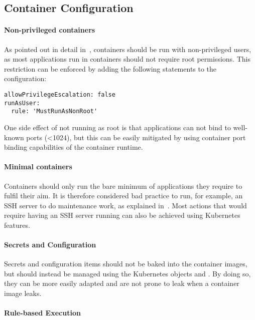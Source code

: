 \subsection{Container Configuration}

\paragraph{Non-privileged containers}

As pointed out in detail in~\textcite{nonPrivContainers}, containers should be run with non-privileged users, as most applications run in containers should not require root permissions. This restriction can be enforced by adding the following statements to the  configuration:

\begin{verbatim}
allowPrivilegeEscalation: false
runAsUser:
  rule: 'MustRunAsNonRoot'
\end{verbatim}

One side effect of not running as root is that applications can not bind to well-known ports (\textless 1024), but this can be easily mitigated by using container port binding capabilities of the container runtime.

\paragraph{Minimal containers}

Containers should only run the bare minimum of applications they require to fulfil their aim. It is therefore considered bad practice to run, for example, an SSH server to do maintenance work, as explained in~\textcite{noSSHDinContainers}. Most actions that would require having an SSH server running can also be achieved using Kubernetes features.

\paragraph{Secrets and Configuration}

Secrets and configuration items should not be baked into the container images, but should instead be managed using the Kubernetes objects  and . By doing so, they can be more easily adapted and are not prone to leak when a container image leaks.

\paragraph{Rule-based Execution}

